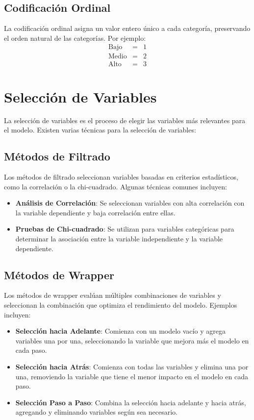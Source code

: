 \subsection{Codificaci\'on Ordinal}

La codificaci\'on ordinal asigna un valor entero \'unico a cada categor\'ia, preservando el orden natural de las categor\'ias. Por ejemplo:
\begin{eqnarray*}
\text{Bajo} &=& 1 \\
\text{Medio} &=& 2 \\
\text{Alto} &=& 3
\end{eqnarray*}

\section{Selecci\'on de Variables}

La selecci\'on de variables es el proceso de elegir las variables m\'as relevantes para el modelo. Existen varias t\'ecnicas para la selecci\'on de variables:

\subsection{M\'etodos de Filtrado}

Los m\'etodos de filtrado seleccionan variables basadas en criterios estad\'isticos, como la correlaci\'on o la chi-cuadrado. Algunas t\'ecnicas comunes incluyen:
\begin{itemize}
    \item \textbf{An\'alisis de Correlaci\'on}: Se seleccionan variables con alta correlaci\'on con la variable dependiente y baja correlaci\'on entre ellas.
    \item \textbf{Pruebas de Chi-cuadrado}: Se utilizan para variables categ\'oricas para determinar la asociaci\'on entre la variable independiente y la variable dependiente.
\end{itemize}

\subsection{M\'etodos de Wrapper}

Los m\'etodos de wrapper eval\'uan m\'ultiples combinaciones de variables y seleccionan la combinaci\'on que optimiza el rendimiento del modelo. Ejemplos incluyen:
\begin{itemize}
    \item \textbf{Selecci\'on hacia Adelante}: Comienza con un modelo vac\'io y agrega variables una por una, seleccionando la variable que mejora m\'as el modelo en cada paso.
    \item \textbf{Selecci\'on hacia Atr\'as}: Comienza con todas las variables y elimina una por una, removiendo la variable que tiene el menor impacto en el modelo en cada paso.
    \item \textbf{Selecci\'on Paso a Paso}: Combina la selecci\'on hacia adelante y hacia atr\'as, agregando y eliminando variables seg\'un sea necesario.
\end{itemize}


